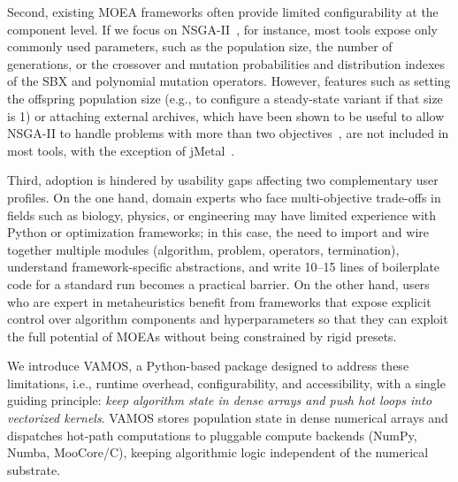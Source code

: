 \documentclass[journal]{IEEEtran}
\newcommand{\VAMOS}{VAMOS}
\begin{document}
Second, existing MOEA frameworks often provide limited configurability at the component level. If we focus on NSGA-II~\cite{DPA+02}, for instance, most tools expose only commonly used parameters, such as the population size, the number of generations, or the crossover and mutation probabilities and distribution indexes of the SBX and polynomial mutation operators. However, features such as setting the offspring population size (e.g., to configure a steady-state variant if that size is 1) or attaching external archives, which have been shown to be useful to allow NSGA-II to handle problems with more than two objectives~\cite{IPS20}, are not included in most tools, with the exception of jMetal~\cite{DN11}.

Third, adoption is hindered by usability gaps affecting two complementary user profiles. On the one hand, domain experts who face multi-objective trade-offs in fields such as biology, physics, or engineering may have limited experience with Python or optimization frameworks; in this case, the need to import and wire together multiple modules (algorithm, problem, operators, termination), understand framework-specific abstractions, and write 10--15 lines of boilerplate code for a standard run becomes a practical barrier. On the other hand, users who are expert in metaheuristics benefit from frameworks that expose explicit control over algorithm components and hyperparameters so that they can exploit the full potential of MOEAs without being constrained by rigid presets.

We introduce \VAMOS{}, a Python-based package designed to address these limitations, i.e., runtime overhead, configurability, and accessibility, with a single guiding principle: \emph{keep algorithm state in dense arrays and push hot loops into vectorized kernels}. \VAMOS{} stores population state in dense numerical arrays and dispatches hot-path computations to pluggable compute backends (NumPy, Numba, MooCore/C), keeping algorithmic logic independent of the numerical substrate.
\end{document}
